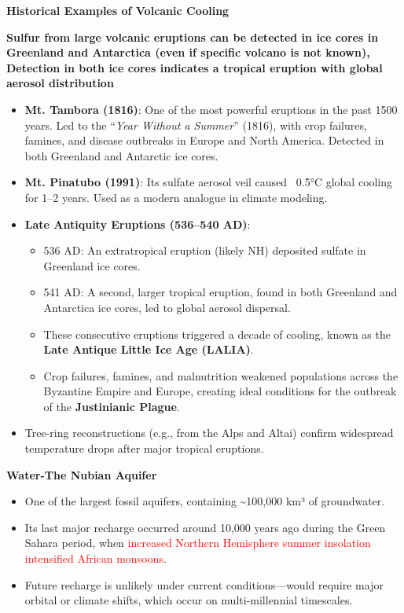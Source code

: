 \documentclass[fontsize=8pt, a4paper, landscape, fleqn]{scrartcl}
\renewcommand{\subsection}[1]{%
    \noindent\colorbox{subsectioncolor}{%
        \parbox{\dimexpr\columnwidth-2\fboxsep}{\color{white}\textbf{#1}}}%
    \vspace{0.5mm}%
}
\begin{document}
\begin{multicols*}{3}[\raggedcolumns]
\subsection{Historical Examples of Volcanic Cooling}
\textbf{Sulfur from large volcanic eruptions can be detected in ice cores in Greenland and Antarctica (even if specific volcano is not known), Detection in both ice cores indicates a tropical eruption with global aerosol distribution}
\begin{itemize}
\item \textbf{Mt. Tambora (1816)}: One of the most powerful eruptions in the past 1500 years. Led to the “\textit{Year Without a Summer}” (1816), with crop failures, famines, and disease outbreaks in Europe and North America. Detected in both Greenland and Antarctic ice cores.
\item \textbf{Mt. Pinatubo (1991)}: Its sulfate aerosol veil caused ~0.5°C global cooling for 1–2 years. Used as a modern analogue in climate modeling.
\item \textbf{Late Antiquity Eruptions (536–540 AD)}:
\begin{itemize}
\item 536 AD: An extratropical eruption (likely NH) deposited sulfate in Greenland ice cores.
\item 541 AD: A second, larger tropical eruption, found in both Greenland and Antarctica ice cores, led to global aerosol dispersal.
\item These consecutive eruptions triggered a decade of cooling, known as the \textbf{Late Antique Little Ice Age (LALIA)}.
\item Crop failures, famines, and malnutrition weakened populations across the Byzantine Empire and Europe, creating ideal conditions for the outbreak of the \textbf{Justinianic Plague}.
\end{itemize}
\item Tree-ring reconstructions (e.g., from the Alps and Altai) confirm widespread temperature drops after major tropical eruptions.
\end{itemize}

\subsection{Water-The Nubian Aquifer}
\begin{itemize}
\item One of the largest fossil aquifers, containing \textasciitilde100,000 km³ of groundwater.
\item Its last major recharge occurred around 10,000 years ago during the Green Sahara period, when \textcolor{red}{increased Northern Hemisphere summer insolation intensified African monsoons}.
\item Future recharge is unlikely under current conditions—would require major orbital or climate shifts, which occur on multi-millennial timescales.
\end{itemize}


\end{multicols*}
\end{document}
